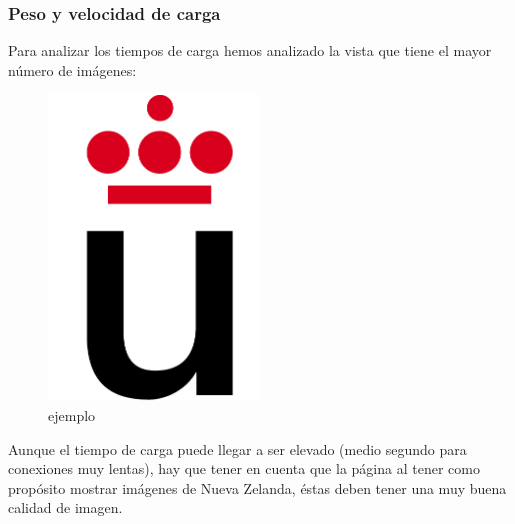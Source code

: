 \subsubsection{Peso y velocidad de carga}
Para analizar los tiempos de carga hemos analizado la vista que tiene el mayor número de imágenes:
\begin{figure}[h]
	\centering
	\includegraphics[width=0.50\textwidth]{./Fotos/logoURJC.jpg}
	\caption{ejemplo}
	\label{fig: ejemplo}
\end{figure}
Aunque el tiempo de carga puede llegar a ser elevado (medio segundo para conexiones muy lentas), hay que tener en cuenta que la página al tener como propósito mostrar imágenes de Nueva Zelanda, éstas deben tener una muy buena calidad de imagen.



